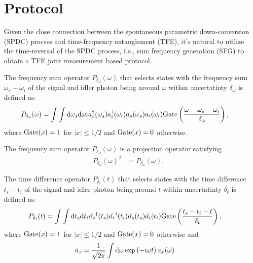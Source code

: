 \documentclass[../../note.tex]{subfiles}
\begin{document}
\section{Protocol}
Given the close connection between the spontaneous parametric down-conversion (SPDC) process and time-frequency entanglement (TFE), it's natural to utilize the time-reversal of the SPDC process, i.e., sum frequency generation (SFG) to obtain a TFE joint measurement based protocol.

\begin{definition}
    The frequency sum operator  $P_{\delta_{\omega}}(\omega)$ that selects states with the frequency sum $\omega_s + \omega_i$ of the signal and idler photon being around $\omega$ within uncertatinty $\delta_{\omega}$  is defined as:
    \begin{align}
        P_{\delta_{\omega}}(\omega)
        &= \int \int {\rm d}\omega_s{\rm d}\omega_i a_s^\dagger(\omega_s) a_i^\dagger(\omega_i) a_s(\omega_s) a_i(\omega_i) {\rm Gate}\left(\frac{\omega -\omega_s-\omega_i}{\delta_{\omega}}\right),
    \end{align}
    where ${\rm Gate}(x) = 1$ for $\vert x \vert \leq 1/2$ and ${\rm Gate}(x) = 0$ otherwise.
\end{definition}

\begin{lemma}
    The frequency sum operator  $P_{\delta_{\omega}}(\omega)$ is a projection operator satisfying
    \begin{align}
        P_{\delta_{\omega}}(\omega)^2
        &= P_{\delta_{\omega}}(\omega).
    \end{align}
\end{lemma}

\begin{definition}
    The time difference operator $P_{\delta_{t}}(t)$ that selects states with the time difference $t_s - t_i$ of the signal and idler photon being around $t$ within uncertatinty $\delta_{t}$  is defined as:
    \begin{align}
        P_{\delta_{t}}(t)
        &= \int \int {\rm d}t_s{\rm d}t_i \tilde{a_s}^\dagger(t_s) \tilde{a_i}^\dagger(t_i) \tilde{a_s}(t_s) \tilde{a_i}(t_i) {\rm Gate}\left(\frac{t_s -t_i-t}{\delta_{t}}\right),
    \end{align}
    where ${\rm Gate}(x) = 1$ for $\vert x \vert \leq 1/2$ and ${\rm Gate}(x) = 0$ otherwise and 
    \begin{align}
        \tilde{a}_x
        &= \frac{1}{\sqrt{2 \pi}} \int {\rm d}\omega \exp\left(-i\omega t\right)a_x(\omega)
    \end{align}
\end{definition}
\end{document}
